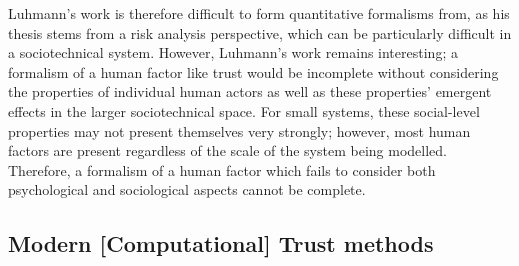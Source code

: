 Luhmann's work is therefore difficult to form quantitative formalisms from, as his thesis stems from a risk analysis perspective, which can be particularly difficult in a sociotechnical system. However, Luhmann's work remains interesting; a formalism of a human factor like trust would be incomplete without considering the properties of individual human actors as well as these properties' emergent effects in the larger sociotechnical space. For small systems, these social-level properties may not present themselves very strongly; however, most human factors are present regardless of the scale of the system being modelled. Therefore, a formalism of a human factor which fails to consider both psychological and sociological aspects cannot be complete. \par


\subsection{Modern [Computational] Trust methods}
